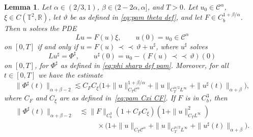 \documentclass[a4paper,11pt]{article}
\newtheorem{lemma}[theorem]{Lemma}
\theoremstyle{remark}
\newcommand{\R}{\mathbb{R}}
\newcommand{\CC}{\ensuremath{\mathscr{C}}}
\newcommand{\mpara}{\,\mathord{\prec\!\!\!\prec}\,}
\begin{document}
\begin{lemma}
  Let $\alpha \in (2/3, 1)$, $\beta \in (2-2\alpha, \alpha]$, and $T>0$. Let $u_0 \in \CC^\alpha$, $\xi \in C(\mathbb{T}^2,\R)$, let $\vartheta$ be as defined in \eqref{eq:pam theta def}, and let $F \in C^{1+\beta/\alpha}_{b}$. Then
  $u$ solves the PDE
  \[
     L u=F ( u ) \xi , \hspace{2em} u ( 0 ) =u_{0} \in \CC^\alpha
  \]
  on $[ 0,T ]$ if and only if $u=F ( u ) \mpara \vartheta +u^{\sharp}$,
  where $u^{\sharp}$ solves
  \[
     L u^{\sharp} = \Phi^{\sharp} , \hspace{2em} u^{\sharp} ( 0 ) =u_{0} - ( F ( u ) \mpara \vartheta ) ( 0 )
  \]
  on $[ 0,T ]$, for $\Phi^{\sharp}$ as defined in {\eqref{eq:phi sharp def pam}}. Moreover, for all $t \in [ 0,T ]$ we have the estimate
  \begin{equation}\label{eq:phi sharp estimate pam}
     \| \Phi^{\sharp} ( t ) \|_{\alpha +\beta - 2} \lesssim C_F C_\xi \big( 1 + \|u\|_{C_T\CC^\alpha}^{1+\beta/\alpha} + \|u\|_{C^{\alpha/2}_TL^\infty} + \|u^\sharp (t)\|_{\alpha+\beta} \big),
  \end{equation}
  where $C_F$ and $C_\xi$ are as defined in~\eqref{eq:pam Cxi CF}. If $F$ is in $C^3_b$, then
  \begin{align}\label{eq:phi sharp estimate pam 2} \nonumber
     \| \Phi^{\sharp} ( t ) \|_{\alpha+\beta-2} & \lesssim \|F\|_{C^3_b} (1+C_F C_\xi) (1+ \|u\|_{C_T L^\infty}^2) \\
     &\hspace{30pt} \times \big( 1 + \|u\|_{C_T\CC^\alpha} + \|u\|_{C^{\alpha/2}_TL^\infty} + \|u^\sharp (t)\|_{\alpha+\beta} \big).
  \end{align}
\end{lemma}
\end{document}
